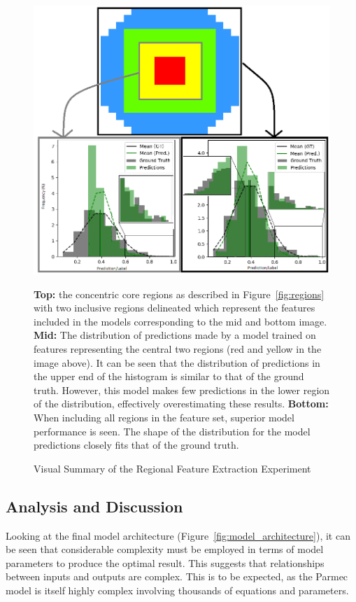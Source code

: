 \begin{figure}[h]
	\centering
	\includegraphics[scale=0.55]{Figures/region_compare2.png}
	\caption{Visual Summary of the Regional Feature Extraction Experiment} {\textbf{Top:} the concentric core regions as described in Figure~\ref{fig:regions} with two inclusive regions delineated which represent the features included in the models corresponding to the mid and bottom image. \textbf{Mid:} The distribution of predictions made by a model trained on features representing the central two regions (red and yellow in the image above). It can be seen that the distribution of predictions in the upper end of the histogram is similar to that of the ground truth. However, this model makes few predictions in the lower region of the distribution, effectively overestimating these results. \textbf{Bottom:} When including all regions in the feature set, superior model performance is seen. The shape of the distribution for the model predictions closely fits that of the ground truth. }
	\label{fig:central}
\end{figure}

\subsection{Analysis and Discussion} \label{analysis}

Looking at the final model architecture 
(Figure~\ref{fig:model_architecture}), it can be seen that considerable complexity must be employed in terms of model parameters to produce the optimal result. This suggests that relationships between inputs and outputs are complex. This is to be expected, as the Parmec model is itself highly complex involving thousands of equations and parameters.
\\

